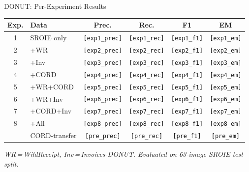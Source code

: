 \documentclass[aspectratio=169,11pt]{beamer}
\newcommand{\VAR}[1]{\texttt{[#1]}\xspace}
\begin{document}
\begin{frame}{DONUT: Per-Experiment Results}
  \centering
  {\small
  \begin{tabular}{@{}clcccc@{}}
    \toprule
    \textbf{Exp.} & \textbf{Data} &
    \textbf{Prec.} & \textbf{Rec.} &
    \textbf{F1} & \textbf{EM} \\
    \midrule
    1 & SROIE only       & \VAR{exp1_prec} & \VAR{exp1_rec} & \VAR{exp1_f1} & \VAR{exp1_em} \\
    2 & +WR              & \VAR{exp2_prec} & \VAR{exp2_rec} & \VAR{exp2_f1} & \VAR{exp2_em} \\
    3 & +Inv             & \VAR{exp3_prec} & \VAR{exp3_rec} & \VAR{exp3_f1} & \VAR{exp3_em} \\
    4 & +CORD            & \VAR{exp4_prec} & \VAR{exp4_rec} & \VAR{exp4_f1} & \VAR{exp4_em} \\
    5 & +WR+CORD         & \VAR{exp5_prec} & \VAR{exp5_rec} & \VAR{exp5_f1} & \VAR{exp5_em} \\
    6 & +WR+Inv          & \VAR{exp6_prec} & \VAR{exp6_rec} & \VAR{exp6_f1} & \VAR{exp6_em} \\
    7 & +CORD+Inv        & \VAR{exp7_prec} & \VAR{exp7_rec} & \VAR{exp7_f1} & \VAR{exp7_em} \\
    8 & +All             & \VAR{exp8_prec} & \VAR{exp8_rec} & \VAR{exp8_f1} & \VAR{exp8_em} \\
    \midrule
      & CORD-transfer    & \VAR{pre_prec}  & \VAR{pre_rec}  & \VAR{pre_f1}  & \VAR{pre_em} \\
    \bottomrule
  \end{tabular}
  }

  \vspace{0.3cm}
  {\small\textit{WR\,=\,WildReceipt, Inv\,=\,Invoices-DONUT.
  Evaluated on 63-image SROIE test split.}}
\end{frame}
\end{document}
